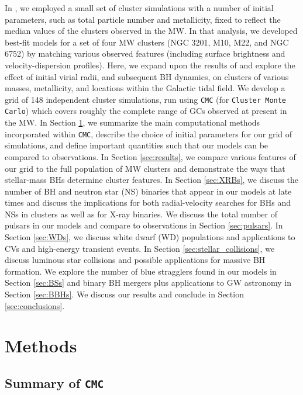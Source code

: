 \documentclass[twocolumn,tighten]{aastex63}
\begin{document}
In \citet{Kremer2019a}, we employed a small set of cluster simulations with a number of initial parameters, such as total particle number and metallicity, fixed to reflect the median values of the clusters observed in the MW. In that analysis, we developed best-fit models for a set of four MW clusters (NGC 3201, M10, M22, and NGC 6752) by matching various observed features (including surface brightness and velocity-dispersion profiles). Here, we expand upon the results of \citet{Kremer2019a} and explore the effect of initial virial radii, and subsequent BH dynamics, on clusters of various masses, metallicity, and locations within the Galactic tidal field. We develop a grid of 148 independent cluster simulations, run using \texttt{CMC} (for \texttt{Cluster Monte Carlo}) which covers roughly the complete range of GCs observed at present in the MW. In Section \ref{sec:method}, we summarize the main computational methods incorporated within \texttt{CMC}, describe the choice of initial parameters for our grid of simulations, and define important quantities such that our models can be compared to observations. In Section \ref{sec:results}, we compare various features of our grid to the full population of MW clusters and demonstrate the ways that stellar-mass BHs determine cluster features. In Section \ref{sec:XRBs}, we discuss the number of BH and neutron star (NS) binaries that appear in our models at late times and discuss the implications for both radial-velocity searches for BHs and NSs in clusters as well as for X-ray binaries. We discuss the total number of pulsars in our models and compare to observations in Section \ref{sec:pulsars}. In Section \ref{sec:WDs}, we discuss white dwarf (WD) populations and applications to CVs and high-energy transient events. In Section \ref{sec:stellar_collisions}, we discuss luminous star collisions and possible applications for massive BH formation. We explore the number of blue stragglers found in our models in Section \ref{sec:BSs} and binary BH mergers plus applications to GW astronomy in Section \ref{sec:BBHs}. We discuss our results and conclude in Section \ref{sec:conclusions}.

\section{Methods}
\label{sec:method}

\subsection{Summary of \texttt{CMC}}
\label{sec:summary}
\end{document}

